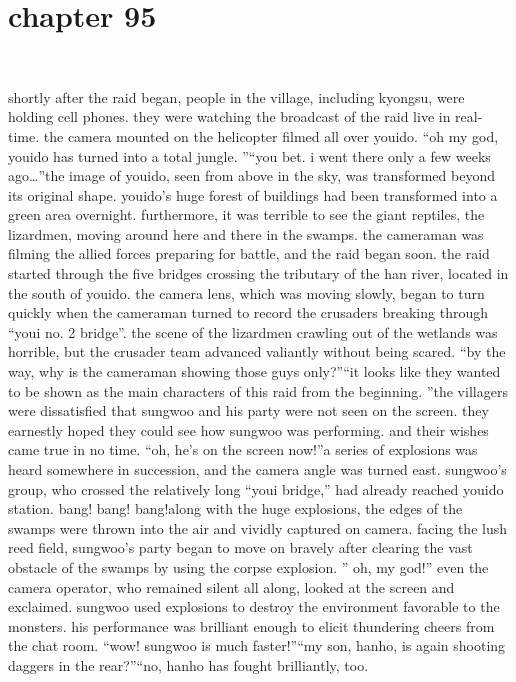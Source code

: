 \section{chapter 95}

                             




shortly after the raid began, people in the village, including kyongsu, were holding cell phones.
 they were watching the broadcast of the raid live in real-time.
the camera mounted on the helicopter filmed all over youido.
“oh my god, youido has turned into a total jungle.
”“you bet.
 i went there only a few weeks ago…”the image of youido, seen from above in the sky, was transformed beyond its original shape.
youido’s huge forest of buildings had been transformed into a green area overnight.
furthermore, it was terrible to see the giant reptiles, the lizardmen, moving around here and there in the swamps.
the cameraman was filming the allied forces preparing for battle, and the raid began soon.
the raid started through the five bridges crossing the tributary of the han river, located in the south of youido.
the camera lens, which was moving slowly, began to turn quickly when the cameraman turned to record the crusaders breaking through “youi no.
 2 bridge”.
the scene of the lizardmen crawling out of the wetlands was horrible, but the crusader team advanced valiantly without being scared.
“by the way, why is the cameraman showing those guys only?”“it looks like they wanted to be shown as the main characters of this raid from the beginning.
”the villagers were dissatisfied that sungwoo and his party were not seen on the screen.
 they earnestly hoped they could see how sungwoo was performing.
and their wishes came true in no time.
“oh, he’s on the screen now!”a series of explosions was heard somewhere in succession, and the camera angle was turned east.
sungwoo’s group, who crossed the relatively long “youi bridge,” had already reached youido station.
bang! bang! bang!along with the huge explosions, the edges of the swamps were thrown into the air and vividly captured on camera.
 facing the lush reed field, sungwoo’s party began to move on bravely after clearing the vast obstacle of the swamps by using the corpse explosion.
” oh, my god!”
even the camera operator, who remained silent all along, looked at the screen and exclaimed.
sungwoo used explosions to destroy the environment favorable to the monsters.
his performance was brilliant enough to elicit thundering cheers from the chat room.
“wow! sungwoo is much faster!”“my son, hanho, is again shooting daggers in the rear?”“no, hanho has fought brilliantly, too.
